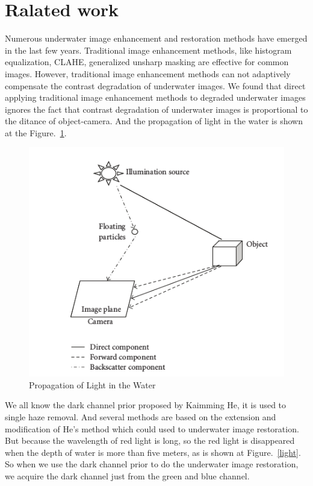 \documentclass[10pt,twocolumn,letterpaper]{article}
\begin{document}
	\section{Ralated work}
	\par Numerous underwater image enhancement and restoration methods have emerged in the last few years. Traditional image enhancement methods, like histogram equalization, CLAHE, generalized unsharp masking are effective for common images. However, traditional image enhancement methods can not adaptively compensate the contrast degradation of underwater images. We found that direct applying traditional image enhancement methods to degraded underwater images ignores the fact that contrast degradation of underwater images is proportional to the ditance of object-camera. And the propagation of light in the water is shown at the Figure.~\ref{pro}.
	\begin{figure}[htbp]
		\begin{center}
			\includegraphics[scale=0.2]{propagation.png}
		\end{center}
		\caption{Propagation of Light in the Water}
		\label{pro}
	\end{figure}
	\par  We all know the dark channel prior proposed by Kaimming He, it is used to single haze removal. And several methods are based on the extension and modification of He's method which could used to underwater image restoration. But because the wavelength of red light is long, so the red light is disappeared when the depth of water is more than five meters, as is shown at Figure.~\ref{light}. So when we use the dark channel prior to do the underwater image restoration, we acquire the dark channel just from the green and blue channel. 
\end{document}
